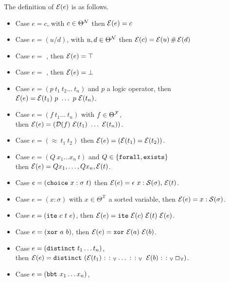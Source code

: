 \begin{definition}
The definition of $\E{e}$ is as follows.
\begin{itemize}
\setlength{\parskip}{0pt}
\item Case $e = c$, with $c \in \Theta^\cal{N}$ then $\E{e} = c$
\item Case $e = (u \slash d)$, with $u,d \in \Theta^\cal{N}$ then $\E{c} = \E{u} \,\#\, \E{d}$
\item Case $e =$ , then $\E{e} = \top$
\item Case $e =$ , then $\E{e} = \bot$
\item Case $e = (p~t_1~t_2\dots~t_n)$ and $p$ a logic operator, then $\E{e} = \E{t_1}~p~\dots~p~\E{t_n}$.
\item Case $e = (f~t_1\dots~t_n)$ with $f \in \Theta^\cal{F}$,\\
  then $\E{e} = (\mathcal{D}(f)~\E{t_1}~\dots~\E{t_n})$.
\item Case $e = (\approx~t_1~t_2)$ then $\E{e} = (\E{t_1} = \E{t_2})$.
\item Case $e = (Q~x_1  \dots x_n ~t)$ and $Q\in \{\kw{forall}, \kw{exists}\}$\\
  then $\E{e} = Q x_1, \dots, Q x_n, \E{t}$.
\item Case $e = (\kw{choice}~x : \sigma ~t)$ then $\E{e} = \epsilon~x: \cal{S}(\sigma),\, \E{t}$.
\item Case $e = (x: \sigma )$ with $x \in \Theta^\mathcal{X}$ a sorted variable, then $\E{e} = x: \cal{S}(\sigma)$.
\item Case $e = (\kw{ite}~c~t~e)$, then $\E{e} = \kw{ite}~\E{c}~\E{t}~\E{e}$.
\item Case $e = (\kw{xor}~a~b)$, then $\E{e} = \kw{xor}~\E{a}~\E{b}$.
\item Case $e = (\kw{distinct}~t_1 \dots t_n)$,\\
  then $\E{e} = \kw{distinct}~(\E{t_1} \mathbin{\colon\colon_\bb{V}} \dots\, \mathbin{\colon\colon_\bb{V}} ~\E{b} \mathbin{\colon\colon_\bb{V}} \Box_\bb{V})$.
\item Case $e = (\kw{bbt}~x_1 \dots x_n)$, 
\end{itemize}
\label{def:function-e}
\end{definition}



